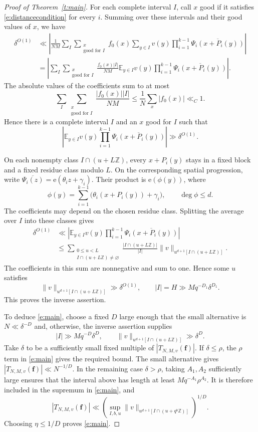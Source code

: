\documentclass[12pt]{amsart}
\newcommand{\1}{\mathbf 1}
\newcommand{\e}{\mathrm e}
\theoremstyle{definition}
\begin{document}
\begin{proof}[Proof of Theorem~\ref{t:main}]
For each complete interval \(I\), call \(x\) good if it satisfies \eqref{e:distancecondition}
for every \(i\). Summing over these
intervals and their good values of \(x\), we have
\[
\begin{aligned}
 \delta^{O(1)}
 &\ll \left|
 \frac1{NM}\sum_I\sum_{\substack{x\\\text{good for }I}}
 f_0(x)\sum_{y\in I}v(y)
 \prod_{i=1}^{k-1}\overline{\Psi_i(x+P_i(y))}
 \right|\\
 &=\left|
 \sum_I\sum_{\substack{x\\\text{good for }I}}
 \frac{f_0(x)|I|}{NM}
 \mathbb E_{y\in I}v(y)
 \prod_{i=1}^{k-1}\overline{\Psi_i(x+P_i(y))}
 \right|.
\end{aligned}
\]
The absolute values of the coefficients sum to at most
\[
 \sum_I\sum_{\substack{x\\\text{good for }I}}
 \frac{|f_0(x)||I|}{NM}
 \leq\frac1N\sum_x|f_0(x)|\ll_C1.
\]
Hence there is a complete interval \(I\) and an \(x\) good for
\(I\) such that
\[
 \left|\mathbb E_{y\in I}v(y)
 \prod_{i=1}^{k-1}\overline{\Psi_i(x+P_i(y))}\right|
 \gg\delta^{O(1)}.
\]

On each nonempty class $I\cap(u+L\mathbb Z)$, every
$x+P_i(y)$ stays in a fixed block and a fixed residue class
modulo $L$. On the corresponding spatial progression, write
$\overline{\Psi_i(z)}=\e(\theta_i z+\gamma_i)$.
Their product is $\e(\phi(y))$, where
\[
 \phi(y)=\sum_{i=1}^{k-1}
       \bigl(\theta_i(x+P_i(y))+\gamma_i\bigr),
 \qquad \deg\phi\leq d.
\]
The coefficients may depend on the chosen residue class.
Splitting the average over $I$ into these classes gives
\[
\begin{aligned}
 \delta^{O(1)}
 &\ll
 \left|\mathbb E_{y\in I}v(y)
       \prod_{i=1}^{k-1}\overline{\Psi_i(x+P_i(y))}\right|\\
 &\leq
 \sum_{\substack{0\leq u<L\\I\cap(u+L\mathbb Z)\ne\varnothing}}
 \frac{|I\cap(u+L\mathbb Z)|}{|I|}
 \|v\|_{u^{d+1}[I\cap(u+L\mathbb Z)]}.
\end{aligned}
\]
The coefficients in this sum are nonnegative and sum to one.
Hence some $u$ satisfies
\[
 \|v\|_{u^{d+1}[I\cap(u+L\mathbb Z)]}\gg\delta^{O(1)},
 \qquad |I|=H\gg Mq^{-D_1}\delta^{D_1}.
\]
This proves the inverse assertion.

To deduce \eqref{e:main}, choose a fixed $D$ large enough that
the small alternative is $N\ll\delta^{-D}$ and, otherwise, the
inverse assertion supplies
\[
 |I|\gg Mq^{-D}\delta^D,
 \qquad
 \|v\|_{u^{d+1}[I\cap(u+L\mathbb Z)]}\gg\delta^D.
\]
Take $\delta$ to be a sufficiently small fixed multiple of
$|T_{N,M,v}(\mathbf f)|$. If $\delta\leq\rho$, the $\rho$ term
in \eqref{e:main} gives the required bound. The small alternative
gives $|T_{N,M,v}(\mathbf f)|\ll N^{-1/D}$. In the remaining case
$\delta>\rho$, taking $A_1,A_2$ sufficiently large ensures that
the interval above has length at least $Mq^{-A_1}\rho^{A_2}$.
It is therefore included in the supremum in \eqref{e:main}, and
\[
 |T_{N,M,v}(\mathbf f)|
 \ll
 \left(\sup_{I,b,u}
 \|v\|_{u^{d+1}[I\cap(u+q^b\mathbb Z)]}\right)^{1/D}.
\]
Choosing $\eta\leq1/D$ proves \eqref{e:main}.
\end{proof}
\end{document}
